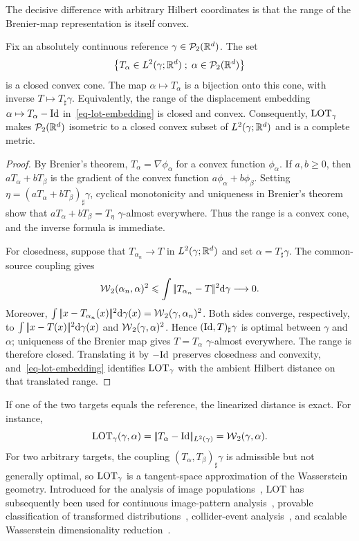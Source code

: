The decisive difference with arbitrary Hilbert coordinates is that the range of the Brenier-map representation is itself convex.
\begin{prop}\label{prop-lot-closed-convex-range}
	Fix an absolutely continuous reference $\gamma\in\mathcal{P}_2(\mathbb{R}^d)$. The set
	\[
		\left\{ T_\alpha\in L^2(\gamma;\mathbb{R}^d) \;;\; \alpha\in\mathcal{P}_2(\mathbb{R}^d) \right\}
	\]
	is a closed convex cone. The map $\alpha\mapsto T_\alpha$ is a bijection onto this cone, with inverse $T\mapsto T_\sharp\gamma$. Equivalently, the range of the displacement embedding $\alpha\mapsto T_\alpha-\mathrm{Id}$ in~\eqref{eq-lot-embedding} is closed and convex. Consequently, $\operatorname{LOT}_\gamma$ makes $\mathcal{P}_2(\mathbb{R}^d)$ isometric to a closed convex subset of $L^2(\gamma;\mathbb{R}^d)$ and is a complete metric.
\end{prop}
\begin{proof}
	By Brenier's theorem, $T_\alpha=\nabla\phi_\alpha$ for a convex function $\phi_\alpha$. If $a,b\geq0$, then $aT_\alpha+bT_\beta$ is the gradient of the convex function $a\phi_\alpha+b\phi_\beta$. Setting $\eta=(aT_\alpha+bT_\beta)_\sharp\gamma$, cyclical monotonicity and uniqueness in Brenier's theorem show that $aT_\alpha+bT_\beta=T_\eta$ $\gamma$-almost everywhere. Thus the range is a convex cone, and the inverse formula is immediate.

	For closedness, suppose that $T_{\alpha_n}\to T$ in $L^2(\gamma;\mathbb{R}^d)$ and set $\alpha=T_\sharp\gamma$. The common-source coupling gives
	\[
		\operatorname{\mathcal{W}}_2(\alpha_n,\alpha)^2
		\leqslant
		\int|\!| T_{\alpha_n}-T |\!|^2\mathrm{d}\gamma
		\longrightarrow0.
	\]
	Moreover,
	$\int|\!| x-T_{\alpha_n}(x) |\!|^2\mathrm{d}\gamma(x)=\operatorname{\mathcal{W}}_2(\gamma,\alpha_n)^2$.
	Both sides converge, respectively, to
	$\int|\!| x-T(x) |\!|^2\mathrm{d}\gamma(x)$ and $\operatorname{\mathcal{W}}_2(\gamma,\alpha)^2$.
	Hence $(\mathrm{Id},T)_\sharp\gamma$ is optimal between $\gamma$ and $\alpha$; uniqueness of the Brenier map gives $T=T_\alpha$ $\gamma$-almost everywhere. The range is therefore closed. Translating it by $-\mathrm{Id}$ preserves closedness and convexity, and~\eqref{eq-lot-embedding} identifies $\operatorname{LOT}_\gamma$ with the ambient Hilbert distance on that translated range.
\end{proof}

If one of the two targets equals the reference, the linearized distance is exact. For instance,
\[
	\operatorname{LOT}_\gamma(\gamma,\alpha)
	=
	|\!| T_\alpha-\mathrm{Id} |\!|_{L^2(\gamma)}
	=
	\operatorname{\mathcal{W}}_2(\gamma,\alpha).
\]
For two arbitrary targets, the coupling $(T_\alpha,T_\beta)_\sharp\gamma$ is admissible but not generally optimal, so $\operatorname{LOT}_\gamma$ is a tangent-space approximation of the Wasserstein geometry. Introduced for the analysis of image populations~\cite{wang2013linear}, LOT has subsequently been used for continuous image-pattern analysis~\cite{kolouri2016continuous}, provable classification of transformed distributions~\cite{moosmuller2023linear}, collider-event analysis~\cite{cai2020linearized}, and scalable Wasserstein dimensionality reduction~\cite{cloninger2025linearized}.

